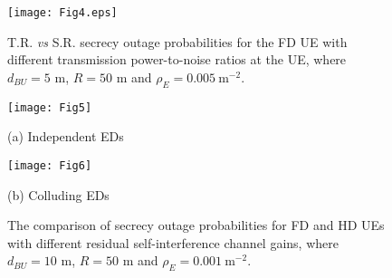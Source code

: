 \documentclass[10pt]{IEEEtran}
\begin{document}
\begin{figure}[!htb]
\centering
\texttt{[image: Fig4.eps]}
\caption{\small T.R. {\em vs} S.R. secrecy outage probabilities for the FD UE with different transmission power-to-noise ratios at the UE, where $d_{BU} = 5$ m, $R = 50$ m and $\rho_E = 0.005~\textrm{m}^{-2}$.}
\label{fig:Fig4}
\end{figure}
\begin{figure*}[]
\begin{minipage}[b]{0.5\linewidth}
  \centering
  \centerline{\texttt{[image: Fig5]}}
 \vspace{0.3cm}
  \centerline{\small (a) Independent EDs}
\end{minipage}
\hfill
\begin{minipage}[b]{0.5\linewidth}
  \centering
  \centerline{\texttt{[image: Fig6]}}
  \vspace{0.3cm}
  \centerline{\small (b) Colluding EDs}
\end{minipage}
 \caption{\small The comparison of secrecy outage probabilities for FD and HD UEs with different residual self-interference channel gains, where $d_{BU} = 10$ m, $R = 50$ m and $\rho_E = 0.001~\textrm{m}^{-2}$.} \label{fig:Fig5}
\end{figure*}
\end{document}
